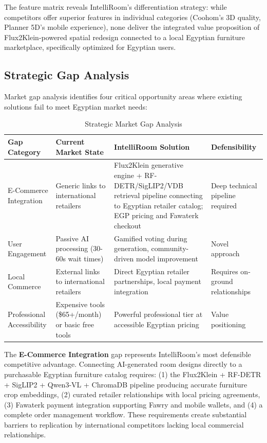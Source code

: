 The feature matrix reveals IntelliRoom's differentiation strategy: while competitors offer superior features in individual categories (Coohom's 3D quality, Planner 5D's mobile experience), none deliver the integrated value proposition of Flux2Klein-powered spatial redesign connected to a local Egyptian furniture marketplace, specifically optimized for Egyptian users.

\subsection{Strategic Gap Analysis}

Market gap analysis identifies four critical opportunity areas where existing solutions fail to meet Egyptian market needs:

\begin{table}[htbp]
\centering
\caption{Strategic Market Gap Analysis}
\label{tab:gap_analysis}
\begin{tabular}{p{2.5cm}p{4cm}p{4cm}p{3cm}}
\toprule
\textbf{Gap Category} & \textbf{Current Market State} & \textbf{IntelliRoom Solution} & \textbf{Defensibility} \\
\midrule
E-Commerce Integration & Generic links to international retailers & Flux2Klein generative engine + RF-DETR/SigLIP2/VDB retrieval pipeline connecting to Egyptian retailer catalog; EGP pricing and Fawaterk checkout & Deep technical pipeline required \\
User Engagement & Passive AI processing (30-60s wait times) & Gamified voting during generation, community-driven model improvement & Novel approach \\
Local Commerce & External links to international retailers & Direct Egyptian retailer partnerships, local payment integration & Requires on-ground relationships \\
Professional Accessibility & Expensive tools (\$65+/month) or basic free tools & Powerful professional tier at accessible Egyptian pricing & Value positioning \\
\bottomrule
\end{tabular}
\end{table}

The \textbf{E-Commerce Integration} gap represents IntelliRoom's most defensible competitive advantage. Connecting AI-generated room designs directly to a purchasable Egyptian furniture catalog requires: (1) the Flux2Klein + RF-DETR + SigLIP2 + Qwen3-VL + ChromaDB pipeline producing accurate furniture crop embeddings, (2) curated retailer relationships with local pricing agreements, (3) Fawaterk payment integration supporting Fawry and mobile wallets, and (4) a complete order management workflow. These requirements create substantial barriers to replication by international competitors lacking local commercial relationships.


